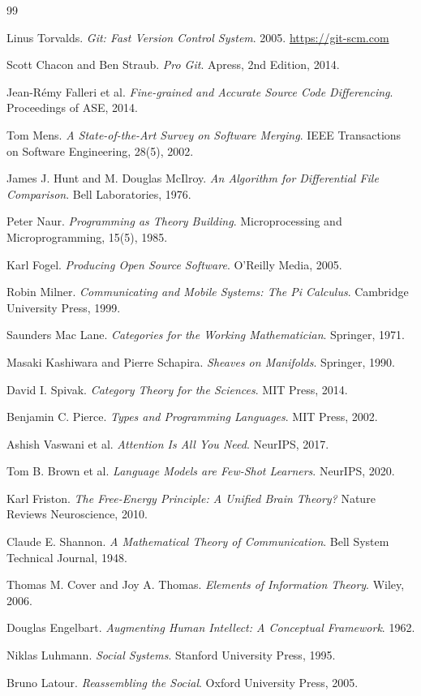 \documentclass[12pt, letterpaper]{article}
\begin{document}
\begin{thebibliography}{99}

 Linus Torvalds. \textit{Git: Fast Version Control System}. 2005. \url{https://git-scm.com}

 Scott Chacon and Ben Straub. \textit{Pro Git}. Apress, 2nd Edition, 2014.

 Jean-R{\'e}my Falleri et al. \textit{Fine-grained and Accurate Source Code Differencing}. Proceedings of ASE, 2014.

 Tom Mens. \textit{A State-of-the-Art Survey on Software Merging}. IEEE Transactions on Software Engineering, 28(5), 2002.

 James J. Hunt and M. Douglas McIlroy. \textit{An Algorithm for Differential File Comparison}. Bell Laboratories, 1976.

 Peter Naur. \textit{Programming as Theory Building}. Microprocessing and Microprogramming, 15(5), 1985.

 Karl Fogel. \textit{Producing Open Source Software}. O'Reilly Media, 2005.

 Robin Milner. \textit{Communicating and Mobile Systems: The Pi Calculus}. Cambridge University Press, 1999.

 Saunders Mac Lane. \textit{Categories for the Working Mathematician}. Springer, 1971.

 Masaki Kashiwara and Pierre Schapira. \textit{Sheaves on Manifolds}. Springer, 1990.

 David I. Spivak. \textit{Category Theory for the Sciences}. MIT Press, 2014.

 Benjamin C. Pierce. \textit{Types and Programming Languages}. MIT Press, 2002.

 Ashish Vaswani et al. \textit{Attention Is All You Need}. NeurIPS, 2017.

 Tom B. Brown et al. \textit{Language Models are Few-Shot Learners}. NeurIPS, 2020.

 Karl Friston. \textit{The Free-Energy Principle: A Unified Brain Theory?} Nature Reviews Neuroscience, 2010.

 Claude E. Shannon. \textit{A Mathematical Theory of Communication}. Bell System Technical Journal, 1948.

 Thomas M. Cover and Joy A. Thomas. \textit{Elements of Information Theory}. Wiley, 2006.

 Douglas Engelbart. \textit{Augmenting Human Intellect: A Conceptual Framework}. 1962.

 Niklas Luhmann. \textit{Social Systems}. Stanford University Press, 1995.

 Bruno Latour. \textit{Reassembling the Social}. Oxford University Press, 2005.

\end{thebibliography}
\end{document}
